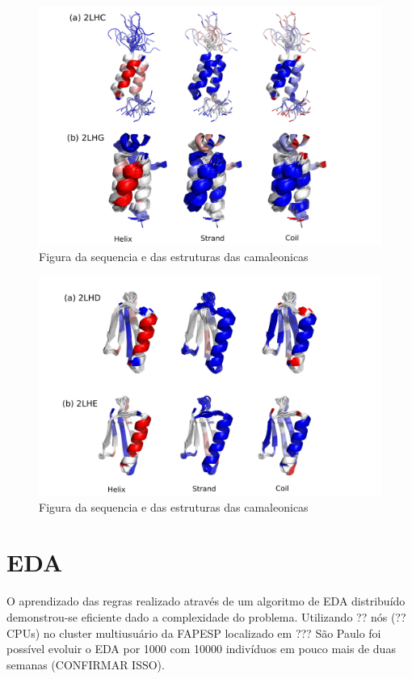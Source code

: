 \begin{figure}
  \centering
  \includegraphics[width=1\textwidth]{figures/camel_2lhc_2lhg.pdf}
  \caption{Figura da sequencia e das estruturas das camaleonicas}
        \label{fig:camel_2lhc_2lhg}
\end{figure}

\begin{figure}
  \centering
  \includegraphics[width=1\textwidth]{figures/camel_2lhd_2lhe.pdf}
  \caption{Figura da sequencia e das estruturas das camaleonicas}
        \label{fig:camel_2lhd_2lhe}
\end{figure}




\section{EDA}

O aprendizado das regras realizado através de um algoritmo de EDA distribuído demonstrou-se eficiente dado a complexidade do problema. Utilizando ?? nós (??CPUs) no cluster multiusuário da FAPESP localizado em ??? São Paulo foi possível evoluir o EDA por 1000 com 10000 indivíduos em pouco mais de duas semanas (CONFIRMAR ISSO).

